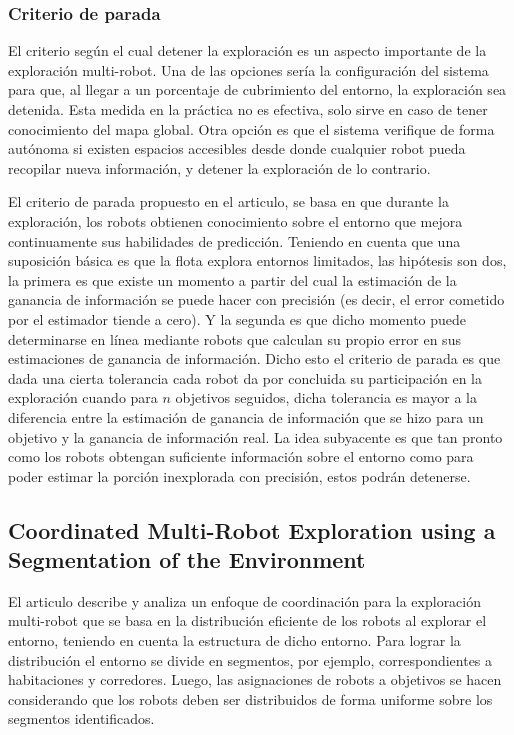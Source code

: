 \subsubsection{Criterio de parada}

El criterio según el cual detener la exploración es un aspecto importante de la exploración multi-robot. Una de las opciones sería la configuración del sistema para que, al llegar a un porcentaje de cubrimiento del entorno, la exploración sea detenida. Esta medida en la práctica no es efectiva, solo sirve en caso de tener conocimiento del mapa global. Otra opción es que el sistema verifique de forma autónoma si existen espacios accesibles desde donde cualquier robot pueda recopilar nueva información, y detener la exploración de lo contrario.

El criterio de parada propuesto en el articulo, se basa en que durante la exploración, los robots obtienen conocimiento sobre el entorno que mejora continuamente sus habilidades de predicción. Teniendo en cuenta que una suposición básica es que la flota explora entornos limitados, las hipótesis son dos, la primera es que existe un momento a partir del cual la estimación de la ganancia de información se puede hacer con precisión (es decir, el error cometido por el estimador tiende a cero). Y la segunda es que dicho momento puede determinarse en línea mediante robots que calculan su propio error en sus estimaciones de ganancia de información. Dicho esto el criterio de parada es que dada una cierta tolerancia cada robot da por concluida su participación en la exploración cuando para $n$ objetivos seguidos, dicha tolerancia es mayor a la diferencia entre la estimación de ganancia de información que se hizo para un objetivo y la ganancia de información real. La idea subyacente es que tan pronto como los robots obtengan suficiente información sobre el entorno como para poder estimar la porción inexplorada con precisión, estos podrán detenerse.



\subsection{Coordinated Multi-Robot Exploration using a Segmentation of the Environment}\cite{wurm2008coordinated}
El articulo describe y analiza un enfoque de coordinación para la exploración multi-robot que se basa en la distribución eficiente de los robots al explorar el entorno, teniendo en cuenta la estructura de dicho entorno. Para lograr la distribución el entorno se divide en segmentos, por ejemplo, correspondientes a habitaciones y corredores. Luego, las asignaciones de robots a objetivos se hacen considerando que los robots deben ser distribuidos de forma uniforme sobre los segmentos identificados. 

